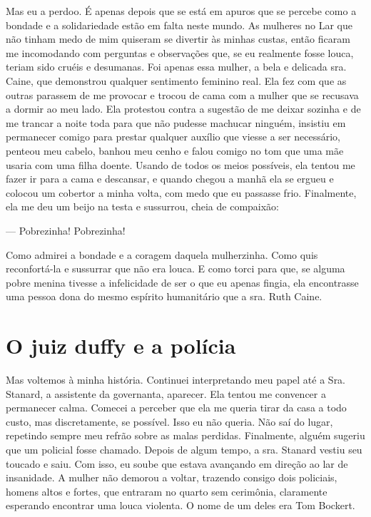 Mas eu a perdoo. É apenas depois que se está em apuros que se percebe
como a bondade e a solidariedade estão em falta neste mundo. As mulheres
no Lar que não tinham medo de mim quiseram se divertir às minhas custas,
então ficaram me incomodando com perguntas e observações que, se eu
realmente fosse louca, teriam sido cruéis e desumanas. Foi apenas essa
mulher, a bela e delicada sra. Caine, que demonstrou qualquer sentimento
feminino real. Ela fez com que as outras parassem de me provocar e
trocou de cama com a mulher que se recusava a dormir ao meu lado. Ela
protestou contra a sugestão de me deixar sozinha e de me trancar a noite
toda para que não pudesse machucar ninguém, insistiu em permanecer
comigo para prestar qualquer auxílio que viesse a ser necessário,
penteou meu cabelo, banhou meu cenho e falou comigo no tom que uma mãe
usaria com uma filha doente. Usando de todos os meios possíveis, ela
tentou me fazer ir para a cama e descansar, e quando chegou a manhã ela
se ergueu e colocou um cobertor a minha volta, com medo que eu passasse
frio. Finalmente, ela me deu um beijo na testa e sussurrou, cheia de
compaixão:

--- Pobrezinha! Pobrezinha!

Como admirei a bondade e a coragem daquela mulherzinha. Como quis
reconfortá-la e sussurrar que não era louca. E como torci para que, se
alguma pobre menina tivesse a infelicidade de ser o que eu apenas
fingia, ela encontrasse uma pessoa dona do mesmo espírito humanitário
que a sra. Ruth Caine.



\chapter{O juiz duffy e a
polícia}\label{capuxedtulo-iv-o-juiz-duffy-e-a-poluxedcia}

Mas voltemos à minha história. Continuei interpretando meu papel até a
Sra. Stanard, a assistente da governanta, aparecer. Ela tentou me
convencer a permanecer calma. Comecei a perceber que ela me queria tirar
da casa a todo custo, mas discretamente, se possível. Isso eu não
queria. Não saí do lugar, repetindo sempre meu refrão sobre as malas
perdidas. Finalmente, alguém sugeriu que um policial fosse chamado.
Depois de algum tempo, a sra. Stanard vestiu seu toucado e saiu. Com
isso, eu soube que estava avançando em direção ao lar de insanidade. A
mulher não demorou a voltar, trazendo consigo dois policiais, homens
altos e fortes, que entraram no quarto sem cerimônia, claramente
esperando encontrar uma louca violenta. O nome de um deles era Tom
Bockert.


